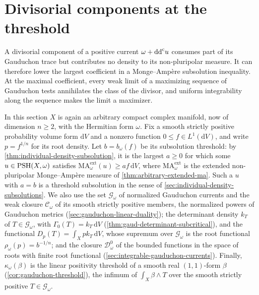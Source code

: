\section{Divisorial components at the threshold}\label{sec:threshold-divisorial-components}

A divisorial component of a positive current $\omega+\mathrm{dd}^{\mathrm{c}} u$ consumes part of its Gauduchon trace but contributes no density to its non-pluripolar measure. It can therefore lower the largest coefficient in a Monge--Amp\`ere subsolution inequality. At the maximal coefficient, every weak limit of a maximizing sequence of Gauduchon tests annihilates the class of the divisor, and uniform integrability along the sequence makes the limit a maximizer.

In this section $X$ is again an arbitrary compact complex manifold, now of dimension $n\geq2$, with the Hermitian form $\omega$. Fix a smooth strictly positive probability volume form $\mathrm{d}V$ and a nonzero function $0\leq f\in L^1(\mathrm{d}V)$, and write $p=f^{1/n}$ for its root density. Let $b=b_\omega(f)$ be its subsolution threshold: by \cref{thm:individual-density-subsolution}, it is the largest $a\geq0$ for which some $u\in\mathrm{PSH}(X,\omega)$ satisfies $\mathrm{MA}^{\mathrm{ext}}_\omega(u)\geq af\,\mathrm{d}V$, where $\mathrm{MA}^{\mathrm{ext}}_\omega$ is the extended non-pluripolar Monge--Amp\`ere measure of \cref{thm:arbitrary-extended-ma}. Such a $u$ with $a=b$ is a threshold subsolution in the sense of \cref{sec:individual-density-subsolutions}. We also use the set $\mathscr G_\omega$ of normalized Gauduchon currents and the weak closure $\mathscr C_\omega$ of its smooth strictly positive members, the normalized powers of Gauduchon metrics (\cref{sec:gauduchon-linear-duality}); the determinant density $k_T$ of $T\in\mathscr G_\omega$, with $\Gamma_0(T)=k_T\,\mathrm{d}V$ (\cref{thm:gaud-determinant-subcritical}), and the functional $D_p(T)=\int_Xp k_T\,\mathrm{d}V$, whose supremum over $\mathscr G_\omega$ is the root functional $\rho_\omega(p)=b^{-1/n}$; and the closure $\mathcal D_\omega^0$ of the bounded functions in the space of roots with finite root functional (\cref{sec:integrable-gauduchon-currents}). Finally, $\kappa_\omega(\beta)$ is the linear positivity threshold of a smooth real $(1,1)$-form $\beta$ (\cref{cor:gauduchon-threshold}), the infimum of $\int_X\beta\wedge T$ over the smooth strictly positive $T\in\mathscr G_\omega$.

